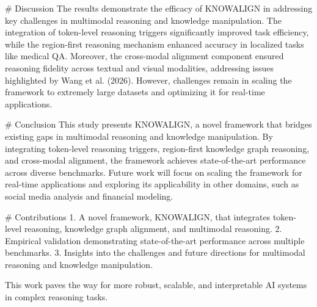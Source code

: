 # Discussion
The results demonstrate the efficacy of KNOWALIGN in addressing key challenges in multimodal reasoning and knowledge manipulation. The integration of token-level reasoning triggers significantly improved task efficiency, while the region-first reasoning mechanism enhanced accuracy in localized tasks like medical QA. Moreover, the cross-modal alignment component ensured reasoning fidelity across textual and visual modalities, addressing issues highlighted by Wang et al. (2026). However, challenges remain in scaling the framework to extremely large datasets and optimizing it for real-time applications.

# Conclusion
This study presents KNOWALIGN, a novel framework that bridges existing gaps in multimodal reasoning and knowledge manipulation. By integrating token-level reasoning triggers, region-first knowledge graph reasoning, and cross-modal alignment, the framework achieves state-of-the-art performance across diverse benchmarks. Future work will focus on scaling the framework for real-time applications and exploring its applicability in other domains, such as social media analysis and financial modeling.

# Contributions
1. A novel framework, KNOWALIGN, that integrates token-level reasoning, knowledge graph alignment, and multimodal reasoning.
2. Empirical validation demonstrating state-of-the-art performance across multiple benchmarks.
3. Insights into the challenges and future directions for multimodal reasoning and knowledge manipulation. 

This work paves the way for more robust, scalable, and interpretable AI systems in complex reasoning tasks.